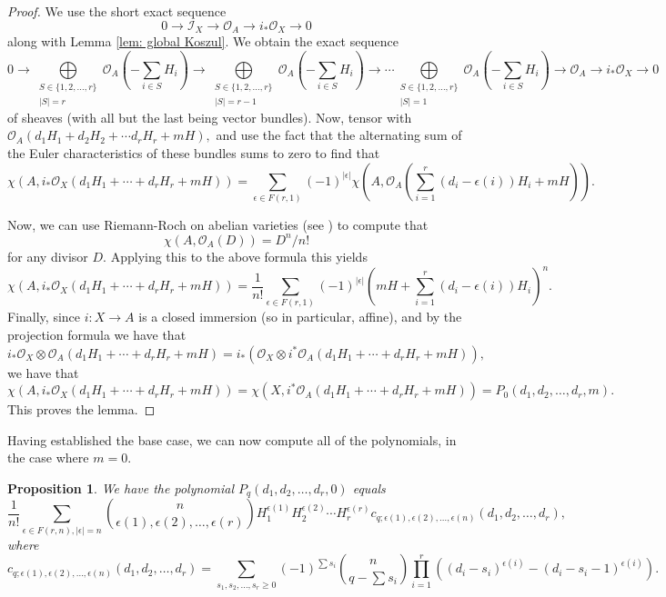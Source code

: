 \documentclass{article}
\newtheorem{prop}[thm]{Proposition}
\theoremstyle{definition}
\theoremstyle{remark}
\begin{document}
\begin{proof}
We use the short exact sequence $$0 \rightarrow \mathcal{I}_X \rightarrow \mathcal{O}_A \rightarrow i_*\mathcal{O}_X \rightarrow 0$$ along with Lemma \ref{lem: global Koszul}. We obtain the exact sequence \[0 \rightarrow \bigoplus\limits_{\substack{S \in \{1, 2, \ldots, r\}\\|S| = r}} \mathcal{O}_A(-\sum\limits_{i \in S} H_i) \rightarrow \bigoplus\limits_{\substack{S \in \{1, 2, \ldots, r\}\\|S| = r-1}} \mathcal{O}_A(-\sum\limits_{i \in S} H_i) \rightarrow \cdots \bigoplus\limits_{\substack{S \in \{1, 2, \ldots, r\}\\|S| = 1}} \mathcal{O}_A(-\sum\limits_{i \in S} H_i) \rightarrow \mathcal{O}_A \rightarrow i_*\mathcal{O}_X \rightarrow 0\] of sheaves (with all but the last being vector bundles). Now, tensor with $\mathcal{O}_A(d_1H_1 + d_2H_2 + \cdots d_rH_r + mH),$ and use the fact that the alternating sum of the Euler characteristics of these bundles sums to zero to find that \[\chi(A, i_*\mathcal{O}_X(d_1H_1 + \cdots + d_rH_r + mH)) = \sum\limits_{\epsilon \in F(r, 1)}(-1)^{|\epsilon|}\chi\left(A, \mathcal{O}_A\left(\sum\limits_{i=1}^r (d_i - \epsilon(i))H_i + mH\right)\right).\]
\par Now, we can use Riemann-Roch on abelian varieties (see \cite[\S 16]{mumford}) to compute that \[\chi(A, \mathcal{O}_A(D)) = D^n/n!\] for any divisor $D.$ Applying this to the above formula this yields \[\chi(A, i_*\mathcal{O}_X(d_1H_1 + \cdots + d_rH_r + mH)) = \frac{1}{n!} \sum\limits_{\epsilon \in F(r, 1)}(-1)^{|\epsilon|}\left(mH + \sum\limits_{i=1}^r (d_i - \epsilon(i))H_i\right)^n.\] Finally, since $i: X \rightarrow A$ is a closed immersion (so in particular, affine), and by the projection formula we have that $i_*\mathcal{O}_X \otimes \mathcal{O}_A(d_1H_1 + \cdots + d_rH_r + mH) = i_*(\mathcal{O}_X \otimes i^*\mathcal{O}_A(d_1H_1 + \cdots + d_rH_r + mH)),$ we have that \[\chi(A, i_*\mathcal{O}_X(d_1H_1 + \cdots + d_rH_r + mH)) = \chi(X, i^*\mathcal{O}_A(d_1H_1 + \cdots + d_rH_r + mH)) = P_0(d_1, d_2, \ldots, d_r, m).\] This proves the lemma.
\end{proof}
Having established the base case, we can now compute all of the polynomials, in the case where $m = 0.$ 
\begin{prop}\label{prop: euler characteristics}
We have the polynomial $P_q(d_1, d_2, \ldots, d_r, 0)$ equals \[\frac{1}{n!} \sum\limits_{\epsilon \in F(r, n), |\epsilon| = n} \binom{n}{\epsilon(1), \epsilon(2), \ldots, \epsilon(r)} H_1^{\epsilon(1)} H_2^{\epsilon(2)}\cdots H _r^{\epsilon(r)} c_{q; \epsilon(1), \epsilon(2), \ldots, \epsilon(n)}(d_1, d_2, \ldots, d_r),\] where \[c_{q; \epsilon(1), \epsilon(2), \ldots, \epsilon(n)}(d_1, d_2, \ldots, d_r) = \sum\limits_{s_1, s_2, \ldots, s_r \geq 0} (-1)^{\sum s_i}\binom{n}{q-\sum s_i} \prod\limits_{i=1}^r \left((d_i - s_i)^{\epsilon(i)} - (d_i - s_i - 1)^{\epsilon(i)}\right).\]
\end{prop}
\end{document}
